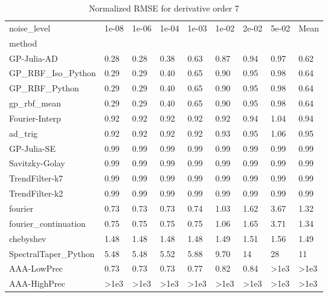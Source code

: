 \begin{table}
\caption{Normalized RMSE for derivative order 7}
\label{tab:nrmse_order_7}
\begin{tabular}{lllllllll}
\toprule
noise_level & 1e-08 & 1e-06 & 1e-04 & 1e-03 & 1e-02 & 2e-02 & 5e-02 & Mean \\
method &  &  &  &  &  &  &  &  \\
\midrule
GP-Julia-AD & 0.28 & 0.28 & 0.38 & 0.63 & 0.87 & 0.94 & 0.97 & 0.62 \\
GP_RBF_Iso_Python & 0.29 & 0.29 & 0.40 & 0.65 & 0.90 & 0.95 & 0.98 & 0.64 \\
GP_RBF_Python & 0.29 & 0.29 & 0.40 & 0.65 & 0.90 & 0.95 & 0.98 & 0.64 \\
gp_rbf_mean & 0.29 & 0.29 & 0.40 & 0.65 & 0.90 & 0.95 & 0.98 & 0.64 \\
Fourier-Interp & 0.92 & 0.92 & 0.92 & 0.92 & 0.92 & 0.94 & 1.04 & 0.94 \\
ad_trig & 0.92 & 0.92 & 0.92 & 0.92 & 0.93 & 0.95 & 1.06 & 0.95 \\
GP-Julia-SE & 0.99 & 0.99 & 0.99 & 0.99 & 0.99 & 0.99 & 0.99 & 0.99 \\
Savitzky-Golay & 0.99 & 0.99 & 0.99 & 0.99 & 0.99 & 0.99 & 0.99 & 0.99 \\
TrendFilter-k7 & 0.99 & 0.99 & 0.99 & 0.99 & 0.99 & 0.99 & 0.99 & 0.99 \\
TrendFilter-k2 & 0.99 & 0.99 & 0.99 & 0.99 & 0.99 & 0.99 & 0.99 & 0.99 \\
fourier & 0.73 & 0.73 & 0.73 & 0.74 & 1.03 & 1.62 & 3.67 & 1.32 \\
fourier_continuation & 0.75 & 0.75 & 0.75 & 0.75 & 1.06 & 1.65 & 3.71 & 1.34 \\
chebyshev & 1.48 & 1.48 & 1.48 & 1.48 & 1.49 & 1.51 & 1.56 & 1.49 \\
SpectralTaper_Python & 5.48 & 5.48 & 5.52 & 5.88 & 9.70 & 14 & 28 & 11 \\
AAA-LowPrec & 0.73 & 0.73 & 0.73 & 0.77 & 0.82 & 0.84 & >1e3 & >1e3 \\
AAA-HighPrec & >1e3 & >1e3 & >1e3 & >1e3 & >1e3 & >1e3 & >1e3 & >1e3 \\
\bottomrule
\end{tabular}
\end{table}
